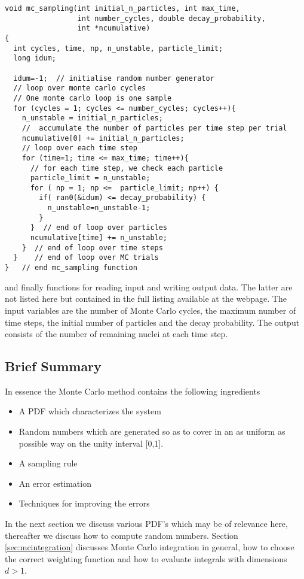 \begin{lstlisting}
void mc_sampling(int initial_n_particles, int max_time, 
                 int number_cycles, double decay_probability, 
                 int *ncumulative)
{
  int cycles, time, np, n_unstable, particle_limit;
  long idum;

  idum=-1;  // initialise random number generator
  // loop over monte carlo cycles 
  // One monte carlo loop is one sample  
  for (cycles = 1; cycles <= number_cycles; cycles++){   
    n_unstable = initial_n_particles;
    //  accumulate the number of particles per time step per trial 
    ncumulative[0] += initial_n_particles;
    // loop over each time step 
    for (time=1; time <= max_time; time++){
      // for each time step, we check each particle
      particle_limit = n_unstable;
      for ( np = 1; np <=  particle_limit; np++) {
        if( ran0(&idum) <= decay_probability) {
          n_unstable=n_unstable-1;
        }
      }  // end of loop over particles 
      ncumulative[time] += n_unstable;
    }  // end of loop over time steps 
  }    // end of loop over MC trials 
}   // end mc_sampling function  
\end{lstlisting}
and finally functions for reading input and writing output data. The latter are not listed here but contained in the full listing available at the webpage. The input variables are the number of Monte Carlo
cycles, the maximum number of time steps, the initial number of particles and the decay probability. 
The output consists of the number of remaining nuclei at each time step. 


\subsection{Brief Summary}


In essence the Monte Carlo method  contains the following ingredients
\begin{svgraybox}
\begin{itemize}
  \item A PDF which characterizes the system
  \item Random numbers which are generated so as to cover in an as uniform as
        possible way on the unity interval [0,1].
  \item A sampling rule
  \item An error estimation
  \item Techniques for improving the errors
\end{itemize}
\end{svgraybox}
In the next section we discuss various PDF's which may be of relevance here, thereafter we
discuss how to  compute random numbers.
Section \ref{sec:mcintegration}  discusses Monte Carlo 
integration in general, how to choose the correct weighting function and
how to evaluate integrals with  
dimensions $ d > 1$.


